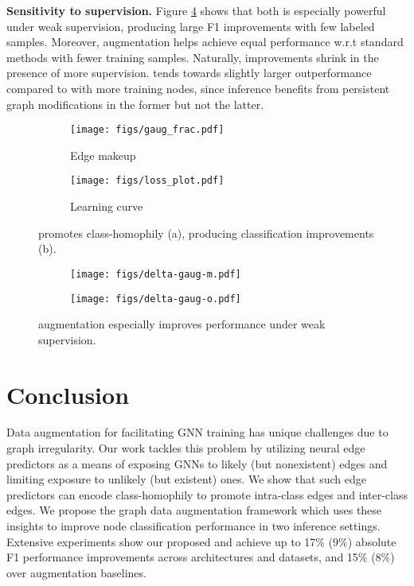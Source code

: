 \documentclass[letterpaper]{article} \usepackage{aaai21}  \usepackage{times}  \usepackage{helvet} \usepackage{courier}  \usepackage[hyphens]{url}  \usepackage{graphicx} \urlstyle{rm} \def\UrlFont{\rm}  \usepackage{natbib}  \usepackage{caption} \frenchspacing  \setlength{\pdfpagewidth}{8.5in}  \setlength{\pdfpageheight}{11in}
\begin{document}
\noindent \textbf{Sensitivity to supervision.}
Figure \ref{fig:trainsize} shows that both \methodshared is especially powerful under weak supervision, producing large F1 improvements with few labeled samples.  Moreover, augmentation helps achieve equal performance w.r.t standard methods with fewer training samples. Naturally, improvements shrink in the presence of more supervision.  \methodtwo tends towards slightly larger outperformance compared to \method with more training nodes, since inference benefits from persistent graph modifications in the former but not the latter.

\begin{figure}[t]
\centering
  \centering
    \begin{subfigure}[b]{.42\linewidth}
    \texttt{[image: figs/gaug\_frac.pdf]}
    \caption{Edge makeup}\label{fig:intra-frac}
    \end{subfigure}
    \begin{subfigure}[b]{.42\linewidth}
    \texttt{[image: figs/loss\_plot.pdf]}
    \caption{Learning curve}\label{fig:loss}
    \end{subfigure}
    
    \caption{\method promotes class-homophily (a), producing classification improvements (b).}
\end{figure}

\begin{figure}[t]
\centering
  \begin{subfigure}[b]{.42\linewidth}
    \texttt{[image: figs/delta-gaug-m.pdf]}
    \caption{\methodtwo}\end{subfigure}
    \begin{subfigure}[b]{.42\linewidth}
    \texttt{[image: figs/delta-gaug-o.pdf]}
    \caption{\method}\end{subfigure}
    \caption{\methodshared augmentation especially improves performance under weak supervision.}
    \label{fig:trainsize}
\end{figure}



 

\section{Conclusion}
\label{sec:conclusion}
Data augmentation for facilitating GNN training has unique challenges due to graph irregularity.  Our work tackles this problem by utilizing neural edge predictors as a means of exposing GNNs to likely (but nonexistent) edges and limiting exposure to unlikely (but existent) ones.  We show that such edge predictors can encode class-homophily to promote intra-class edges and inter-class edges. We propose the \methodshared graph data augmentation framework which uses these insights to improve node classification performance in two inference settings. Extensive experiments show our proposed \method and \methodtwo achieve up to 17\% (9\%) absolute F1 performance improvements across architectures and datasets, and 15\% (8\%) over augmentation baselines.
%
 
\end{document}
